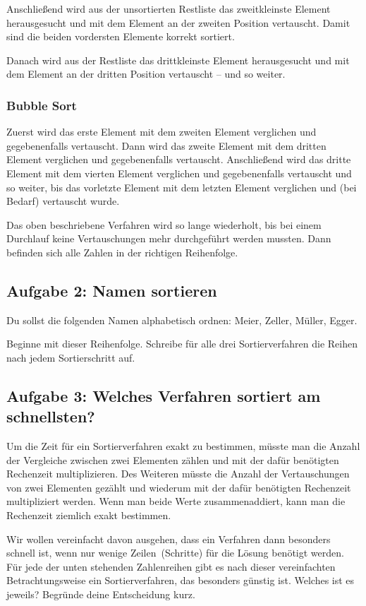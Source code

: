 Anschließend wird aus der unsortierten Restliste das zweitkleinste Element
herausgesucht und mit dem Element an der zweiten Position vertauscht. Damit
sind die beiden vordersten Elemente korrekt sortiert.

Danach wird aus der Restliste das drittkleinste Element herausgesucht und mit
dem Element an der dritten Position vertauscht -- und so weiter.

\subsubsection{Bubble Sort}

Zuerst wird das erste Element mit dem zweiten Element verglichen und
gegebenenfalls vertauscht. Dann wird das zweite Element mit dem dritten Element
verglichen und gegebenenfalls vertauscht. Anschließend wird das dritte Element
mit dem vierten Element verglichen und gegebenenfalls vertauscht und so weiter,
bis das vorletzte Element mit dem letzten Element verglichen und (bei Bedarf)
vertauscht wurde.

Das oben beschriebene Verfahren wird so lange wiederholt, bis bei einem
Durchlauf keine Vertauschungen mehr durchgeführt werden mussten. Dann
befinden sich alle Zahlen in der richtigen Reihenfolge.


\subsection{Aufgabe 2: Namen sortieren}

Du sollst die folgenden Namen alphabetisch ordnen: Meier, Zeller, Müller, Egger.

Beginne mit dieser Reihenfolge. Schreibe für alle drei Sortierverfahren die
Reihen nach jedem Sortierschritt auf.


\subsection{Aufgabe 3: Welches Verfahren sortiert am schnellsten?}

Um die Zeit für ein Sortierverfahren exakt zu bestimmen, müsste man die Anzahl
der Vergleiche zwischen zwei Elementen zählen und mit der dafür benötigten
Rechenzeit multiplizieren. Des Weiteren müsste die Anzahl der Vertauschungen
von zwei Elementen gezählt und wiederum mit der dafür benötigten
Rechenzeit multipliziert werden. Wenn man beide Werte zusammenaddiert, kann
man die Rechenzeit ziemlich exakt bestimmen.

Wir wollen vereinfacht davon ausgehen, dass ein Verfahren dann besonders
schnell ist, wenn nur wenige \glqq Zeilen\grqq\ (Schritte) für die Lösung benötigt werden. Für jede
der unten stehenden Zahlenreihen gibt es nach dieser vereinfachten
Betrachtungsweise ein Sortierverfahren, das besonders günstig ist. Welches ist
es jeweils? Begründe deine Entscheidung kurz.

